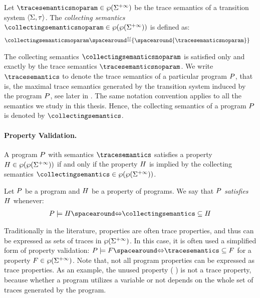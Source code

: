 \begin{definition}
  Let $\tracesemanticsnoparam\in\tracetype$ be the trace semantics of a transition system $\langle \Sigma, \tau \rangle$. The \emph{collecting semantics} $\collectingsemanticsnoparam\in\collectingtype$ is defined as:
  \begin{align*}
    \collectingsemanticsnoparam &\DefeQ \{\spacearound{\tracesemanticsnoparam}\}
  \end{align*}
\end{definition}

The collecting semantics $\collectingsemanticsnoparam$ is satisfied only and exactly by the trace semantics $\tracesemanticsnoparam$.
We write $\tracesemantics$ to denote the trace semantics of a particular program $P$, that is, the maximal trace semantics generated by the transition system induced by the program $P$, see later in .
The same notation convention applies to all the semantics we study in this thesis. Hence, the collecting semantics of a program $P$ is denoted by $\collectingsemantics$.

\paragraph{Property Validation.}

A program $P$ with semantics $\tracesemantics$ satisfies a property $H \in \wp(\wp(\Sigma^{+\infty}))$ if and only if the property $H$ is implied by the collecting semantics $\collectingsemantics\in\collectingtype$.


\begin{definition}
  Let $P$ be a program and $H$ be a property of programs. We say that $P$ \emph{satisfies} $H$ whenever:
  \begin{align*}
    \defprogram \satisfies \defproperty \IfF \collectingsemantics \subseteq \defproperty
  \end{align*}
\end{definition}

Traditionally in the literature, properties are often trace properties, and thus can be expressed as sets of traces in $\wp(\Sigma^{+\infty})$. In this case, it is often used a simplified form of property validation: $\defprogram \satisfies F \IfF \tracesemantics \subseteq F$ for a property $F \in \wp(\Sigma^{+\infty})$.
Note that, not all program properties can be expressed as trace properties. As an example, the unused property  (\cf{} ) is not a trace property, because whether a program utilizes a variable or not depends on the whole set of traces generated by the program.


